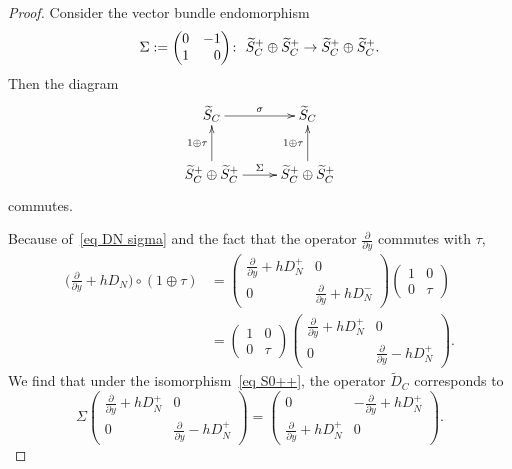 \documentclass[pdftex]{sigma}%
\numberwithin{equation}{section}
\begin{document}
\begin{proof}
Consider the vector bundle endomorphism
\[
\Sigma := \begin{pmatrix}0&-1\\1&\hphantom{-}0\end{pmatrix}\!\colon\ \widetilde{S}_C^+ \oplus \widetilde{S}_C^+\to \widetilde{S}_C^+ \oplus \widetilde{S}_C^+.
\]
Then the diagram{\samepage
\[
\xymatrix{
\widetilde{S}_C \ar[r]^-{\sigma} & \widetilde{S}_C \\
\widetilde{S}_C^+ \oplus \widetilde{S}_C^+ \ar[r]^-{\Sigma} \ar[u]^-{1\oplus \tau}& \widetilde{S}_C^+ \oplus \widetilde{S}_C^+\ar[u]^-{1\oplus \tau}
}
\]
commutes.}

Because of~\eqref{eq DN sigma} and the fact that
the operator $\frac{\partial}{\partial y}$ commutes with $\tau$,
\begin{align*}
\bigg(\frac{\partial}{\partial y}+hD_N\bigg) \circ (1\oplus \tau) &=
\begin{pmatrix}
\frac{\partial}{\partial y}+hD_N^+&0\\
0&\frac{\partial}{\partial y}+hD_N^-
 \end{pmatrix}
\begin{pmatrix}
1 & 0 \\
0 & \tau
\end{pmatrix}\\
&=
\begin{pmatrix}
1 & 0 \\
0 & \tau
\end{pmatrix}\begin{pmatrix}
\frac{\partial}{\partial y}+hD_N^+&0\\
0&\frac{\partial}{\partial y}-hD_N^+
 \end{pmatrix}\!.
\end{align*}
 We find that under the isomorphism~\eqref{eq S0++}, the operator $\widetilde{D}_C$ corresponds to
\begin{equation*}
\Sigma
\begin{pmatrix}
\frac{\partial}{\partial y}+hD_N^+&0\\
0&\frac{\partial}{\partial y}-hD_N^+
 \end{pmatrix}
 =\begin{pmatrix}
0 & -\frac{\partial}{\partial y}+hD_N^+\\
\frac{\partial}{\partial y}+hD_N^+& 0
 \end{pmatrix}\!.\tag*{\qed}
\end{equation*}
\renewcommand{\qed}{}
\end{proof}
\end{document}
